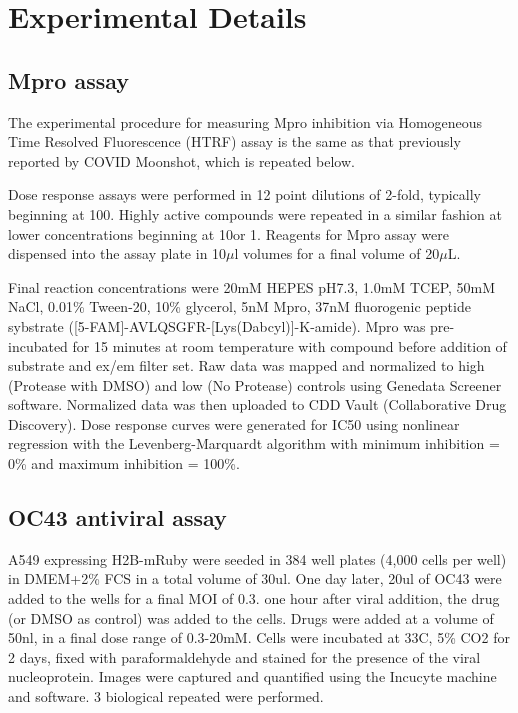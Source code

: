 
\chapter{Experimental Details} \label{appendix:experiments}

\section{Mpro assay}
The experimental procedure for measuring Mpro inhibition via Homogeneous Time Resolved Fluorescence (HTRF) assay is the same as that previously reported by COVID Moonshot\cite{Moonshot2022}, which is repeated below.

Dose response assays were performed in 12 point dilutions of 2-fold, typically beginning at 100\uM. Highly active compounds were repeated in a similar fashion at lower concentrations beginning at 10\uM or 1\uM. Reagents for Mpro assay were dispensed into the assay plate in 10$\mu$l volumes for a final volume of 20$\mu$L.

Final reaction concentrations were 20mM HEPES pH7.3, 1.0mM TCEP, 50mM NaCl, 0.01\% Tween-20, 10\% glycerol, 5nM Mpro, 37nM fluorogenic peptide sybstrate ([5-FAM]-AVLQSGFR-[Lys(Dabcyl)]-K-amide). Mpro was pre-incubated for 15 minutes at room temperature with compound before addition of substrate and ex/em filter set. Raw data was mapped and normalized to high (Protease with DMSO) and low (No Protease) controls using Genedata Screener software. Normalized data was then uploaded to CDD Vault (Collaborative Drug Discovery). Dose response curves were generated for IC50 using nonlinear regression with the Levenberg-Marquardt algorithm with minimum inhibition = 0\% and maximum inhibition = 100\%.

\section{OC43 antiviral assay}
A549 expressing H2B-mRuby were seeded in 384 well plates (4,000 cells per well) in DMEM+2\% FCS in a total volume of 30ul. One day later, 20ul of OC43 were added to the wells for a final MOI of 0.3. one hour after viral addition, the drug (or DMSO as control) was added to the cells. Drugs were added at a volume of 50nl, in a final dose range of 0.3-20mM. Cells were incubated at 33C, 5\% CO2 for 2 days, fixed with paraformaldehyde and stained for the presence of the viral nucleoprotein. Images were captured and quantified using the Incucyte machine and software. 3 biological repeated were performed.


